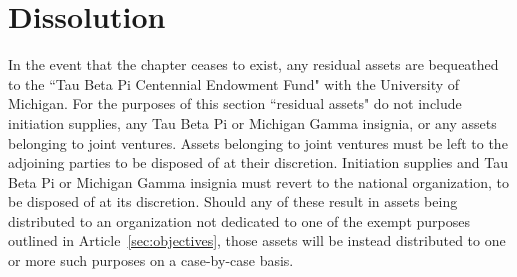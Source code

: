 \chapter{Dissolution}\label{sec:dissolution}
 In the event that the chapter ceases to exist, any residual assets are bequeathed to the ``Tau Beta Pi  Centennial Endowment Fund" with the University of Michigan. For the purposes of this section ``residual assets" do not include initiation supplies, any Tau Beta Pi or Michigan Gamma insignia, or any assets belonging to joint ventures. Assets belonging to joint ventures must be left to the adjoining parties to be disposed of at their discretion. Initiation supplies and Tau Beta Pi or Michigan Gamma insignia must revert to the national organization, to be disposed of at its discretion. Should any of these result in assets being distributed to an organization not dedicated to one of the exempt purposes outlined in Article~\ref{sec:objectives}, those assets will be instead distributed to one or more such purposes on a case-by-case basis.